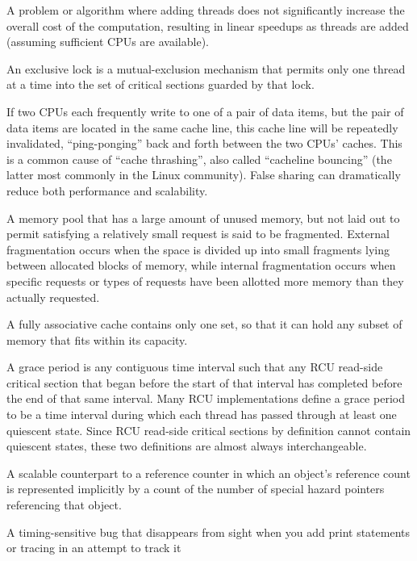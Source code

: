 \begin{description}
	A problem or algorithm where adding threads does not significantly
	increase the overall cost of the computation, resulting in
	linear speedups as threads are added (assuming sufficient
	CPUs are available).
\item[\IXh{Exclusive}{Lock}:]
	An exclusive lock is a mutual-exclusion mechanism that
	permits only one thread at a time into the
	set of critical sections guarded by that lock.
\item[\IX{False Sharing}:]
	If two CPUs each frequently write to one of a pair of data items,
	but the pair of data items are located in the same cache line,
	this cache line will be repeatedly invalidated, ``ping-ponging''
	back and forth between the two CPUs' caches.
	This is a common cause of ``cache thrashing'', also called
	``cacheline bouncing'' (the latter most commonly in the Linux
	community).
	False sharing can dramatically reduce both performance and
	scalability.
\item[\IX{Fragmentation}:]
	A memory pool that has a large amount of unused memory, but
	not laid out to permit satisfying a relatively small request
	is said to be fragmented.
	External fragmentation occurs when the space is divided up
	into small fragments lying between allocated blocks of memory,
	while internal fragmentation occurs when specific requests or
	types of requests have been allotted more memory than they
	actually requested.
\item[\IXh{Fully Associative}{Cache}:]
	A fully associative cache contains only
	one set, so that it can hold any subset of
	memory that fits within its capacity.
\item[\IX{Grace Period}:]
	A grace period is any contiguous time interval such that
	any RCU read-side critical section that began before the
	start of that interval has
	completed before the end of that same interval.
	Many RCU implementations define a grace period to be a
	time interval during which each thread has passed through at
	least one quiescent state.
	Since RCU read-side critical sections by definition cannot
	contain quiescent states, these two definitions are almost
	always interchangeable.
\item[\IX{Hazard Pointer}:]
	A scalable counterpart to a reference counter in which an
	object's reference count is represented implicitly by a count
	of the number of special hazard pointers referencing that object.
\item[\IX{Heisenbug}:]
	A timing-sensitive bug that disappears from sight when you
	add print statements or tracing in an attempt to track it

\end{description}
